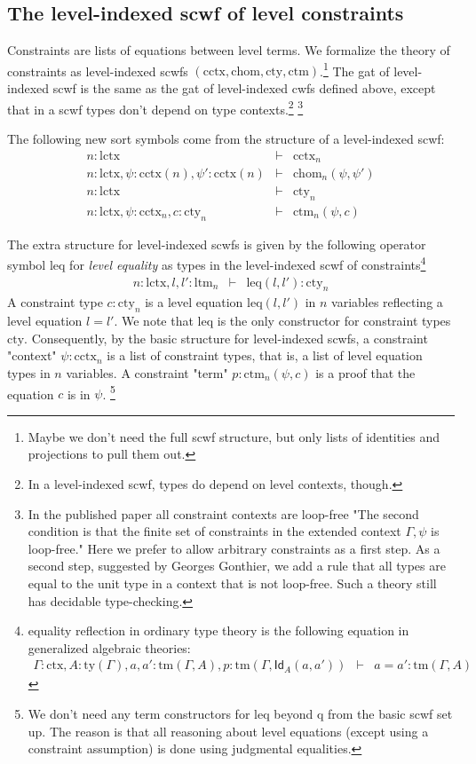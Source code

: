 \documentclass[11pt,a4paper]{article}
\theoremstyle{definition}
\newcommand{\Id}{\mathsf{Id}}
\def\lctx{\mathrm{lctx}}
\def\ltm{\mathrm{ltm}}
\def\leq{\mathrm{leq}}
\def\cctx{\mathrm{cctx}}
\def\cty{\mathrm{cty}}
\def\ctm{\mathrm{ctm}}
\def\chom{\mathrm{chom}}
\newcommand{\ctx}{\mathrm{ctx}}
\newcommand{\ty}{\mathrm{ty}}
\newcommand{\tm}{\mathrm{tm}}
\def\q{\mathrm{q}}
\begin{document}
\subsection{The level-indexed scwf of level constraints}

Constraints are lists of equations between level terms. We formalize the theory of constraints as level-indexed scwfs $(\cctx, \chom, \cty, \ctm)$.\footnote{Maybe we don't need the full scwf structure, but only lists of identities and projections to pull them out.} The gat of level-indexed scwf is the same as the gat of level-indexed cwfs defined above, except that in a scwf types don't depend on type contexts.\footnote{In a level-indexed scwf, types do depend on level contexts, though.} \footnote{In the published paper all constraint contexts are loop-free "The second condition is that the finite set of constraints in the extended context $\Gamma, \psi$ is loop-free." Here we prefer to allow arbitrary constraints as a first step. As a second step, suggested by Georges Gonthier, we add a rule that all types are equal to the unit type in a context that is not loop-free. Such a theory still has decidable type-checking.}

The following new sort symbols come from the structure of a level-indexed scwf:
\begin{eqnarray*}
n : \lctx &\vdash& \cctx_n\\
n : \lctx, \psi : \cctx(n), \psi' : \cctx(n) &\vdash& \chom_n(\psi,\psi')\\
n : \lctx &\vdash& \cty_n\\
n : \lctx, \psi : \cctx_n, c : \cty_n &\vdash& \ctm_n(\psi,c)
\end{eqnarray*}

The extra structure for level-indexed scwfs is given by the following operator symbol $\leq$ for {\em level equality} as types in the level-indexed scwf of constraints\footnote{equality reflection in ordinary type theory is the following equation in generalized algebraic theories:
\begin{eqnarray*}
\Gamma : \ctx, A : \ty(\Gamma), a, a' : \tm(\Gamma, A),p :  \tm(\Gamma,\Id_A(a,a'))&\vdash& a = a' : \tm(\Gamma,A)
\end{eqnarray*}
}
\begin{eqnarray*}
n : \lctx, l, l' : \ltm_n &\vdash& \leq(l,l') : \cty_n
\end{eqnarray*}
A constraint type $c : \cty_n$ is a level equation 
$\leq(l,l')$ in $n$ variables reflecting a level equation $l = l'$.
We note that $\leq$ is the only constructor for constraint types $\cty$. 
Consequently, by the basic structure for level-indexed scwfs,
a constraint "context" $\psi : \cctx_n$ is a list of constraint types, 
that is, a list of level equation types in $n$ variables. 
A constraint "term" $p : \ctm_n(\psi,c)$ is a proof that the equation $c$ is
in $\psi$.
\footnote{We don't need 
any term constructors for $\leq$ beyond $\q$ from the basic
scwf set up. The reason is that all reasoning about level equations 
(except using a constraint assumption) is done using judgmental equalities.} 
\end{document}
